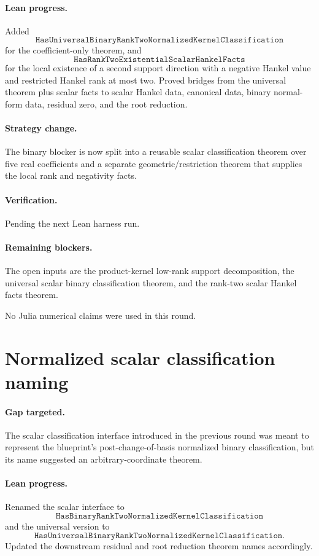 \documentclass[11pt]{article}
\begin{document}
\paragraph{Lean progress.}
Added
\[
\texttt{HasUniversalBinaryRankTwoNormalizedKernelClassification}
\]
for the coefficient-only theorem, and
\[
\texttt{HasRankTwoExistentialScalarHankelFacts}
\]
for the local existence of a second support direction with a negative Hankel
value and restricted Hankel rank at most two.  Proved bridges from the
universal theorem plus scalar facts to scalar Hankel data, canonical data,
binary normal-form data, residual zero, and the root reduction.

\paragraph{Strategy change.}
The binary blocker is now split into a reusable scalar classification theorem
over five real coefficients and a separate geometric/restriction theorem that
supplies the local rank and negativity facts.

\paragraph{Verification.}
Pending the next Lean harness run.

\paragraph{Remaining blockers.}
The open inputs are the product-kernel low-rank support decomposition, the
universal scalar binary classification theorem, and the rank-two scalar Hankel
facts theorem.

No Julia numerical claims were used in this round.

\section*{Normalized scalar classification naming}

\paragraph{Gap targeted.}
The scalar classification interface introduced in the previous round was meant
to represent the blueprint's post-change-of-basis normalized binary
classification, but its name suggested an arbitrary-coordinate theorem.

\paragraph{Lean progress.}
Renamed the scalar interface to
\[
\texttt{HasBinaryRankTwoNormalizedKernelClassification}
\]
and the universal version to
\[
\texttt{HasUniversalBinaryRankTwoNormalizedKernelClassification}.
\]
Updated the downstream residual and root reduction theorem names accordingly.
\end{document}
